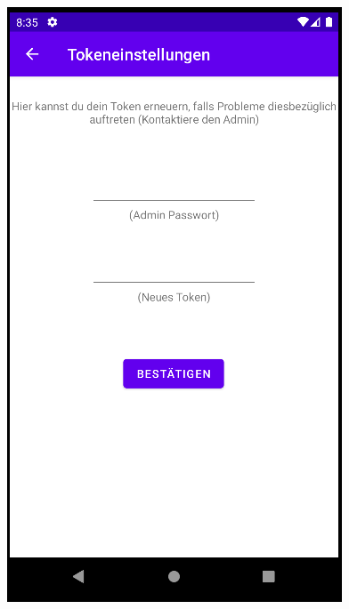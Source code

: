 \documentclass{article}
\begin{document}
\begin{center}
    \includegraphics[scale=0.45]{token_new.png}
\end{center}



\newpage
\end{document}

